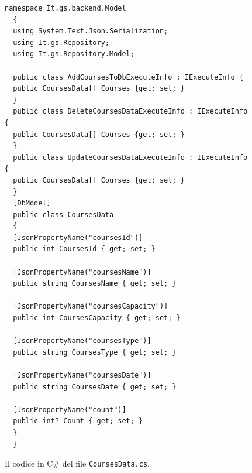 \begin{figure}[H]
\begin{lstlisting}[linewidth=20cm, caption={Il codice in C\# del file \texttt{CoursesData.cs}.}, captionpos=b, label={lst:coursesdata}]
  namespace It.gs.backend.Model
  {
  using System.Text.Json.Serialization;
  using It.gs.Repository;
  using It.gs.Repository.Model;

  public class AddCoursesToDbExecuteInfo : IExecuteInfo {
  public CoursesData[] Courses {get; set; }
  }
  public class DeleteCoursesDataExecuteInfo : IExecuteInfo {
  public CoursesData[] Courses {get; set; }
  }
  public class UpdateCoursesDataExecuteInfo : IExecuteInfo {
  public CoursesData[] Courses {get; set; }
  }
  [DbModel]
  public class CoursesData
  {
  [JsonPropertyName("coursesId")]
  public int CoursesId { get; set; }

  [JsonPropertyName("coursesName")]
  public string CoursesName { get; set; }

  [JsonPropertyName("coursesCapacity")]
  public int CoursesCapacity { get; set; }

  [JsonPropertyName("coursesType")]
  public string CoursesType { get; set; }

  [JsonPropertyName("coursesDate")]
  public string CoursesDate { get; set; }

  [JsonPropertyName("count")]
  public int? Count { get; set; }
  }
  }
\end{lstlisting}
\caption{\label{fig:coursesdata}Il codice in C\# del file \texttt{CoursesData.cs}.}
\end{figure}
\newpage


